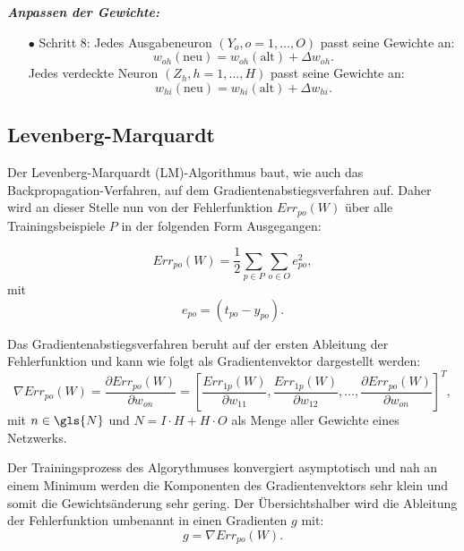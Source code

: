 \textbf{\textit{Anpassen der Gewichte:}}
\begin{itemize}
\item[\textbf{$\bullet$}] Schritt 8: Jedes Ausgabeneuron $(Y_{o}, o=1,\dots,O)$ passt seine Gewichte an: 
\begin{equation}
w_{oh}(\text{neu})=w_{oh}(\text{alt})+\Delta w_{oh}.
\end{equation}
Jedes verdeckte Neuron $(Z_{h}, h=1,\dots,H)$ passt seine Gewichte an:
\begin{equation}
w_{hi}(\text{neu})=w_{hi}(\text{alt})+\Delta w_{hi}.
\end{equation}

\end{itemize}

\subsection{Levenberg-Marquardt}\label{sec:LM_herleitung}


Der Levenberg-Marquardt (LM)-Algorithmus baut, wie auch das Backpropagation-Verfahren, auf dem Gradientenabstiegsverfahren auf. Daher wird an dieser Stelle nun von der Fehlerfunktion $Err_{po}(W)$ über alle Trainingsbeispiele $P$ in der folgenden Form Ausgegangen:

\begin{equation}
Err_{po}(W)= \frac{1}{2} \sum\limits_{p \in P} \sum\limits_{o \in O} e_{po}^2,
\label{gl:LM_fehler}
\end{equation}
mit
\begin{equation}
e_{po}=(t_{po}-y_{po}).
\end{equation}

Das Gradientenabstiegsverfahren beruht auf der ersten Ableitung der Fehlerfunktion und kann wie folgt als Gradientenvektor dargestellt werden:
\begin{equation}
\nabla Err_{po}(W)= \frac{\partial Err_{po}(W)}{\partial w_{on}}= \left [ \frac{Err_{1p}(W)}{\partial w_{11}} , \frac{Err_{1p}(W)}{\partial w_{12}}, \dots,  \frac{\partial Err_{po}(W)}{\partial w_{on}}  \right ]^T,
\label{gl:LM_bp_err}
\end{equation}
mit $n \in \gls{N}$ und $N= I \cdot H + H \cdot O$ als Menge aller Gewichte eines Netzwerks.

Der Trainingsprozess des Algorythmuses konvergiert asymptotisch und nah an einem Minimum werden die Komponenten des Gradientenvektors sehr klein und somit die Gewichtsänderung sehr gering. Der Übersichtshalber wird die Ableitung der Fehlerfunktion umbenannt in einen Gradienten $g$ mit:
\begin{equation}
g= \nabla Err_{po}(W).
\label{gl:LM_gradient}
\end{equation}

